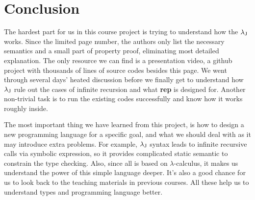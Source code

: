 \section{Conclusion}
\label{conclusion}

The hardest part for us in this course project is trying to understand how the ${\lambda_{\text{J}}}$ works. Since the limited page number, the authors only list the necessary semantics and a small part of property proof, eliminating most detailed explanation. The only resource we can find is a presentation video, a github project with thousands of lines of source codes besides this page. We went through several days' heated discussion before we finally get to understand how ${\lambda_{\text{J}}}$ rule out the cases of infinite recursion and what \textbf{rep} is designed for. Another non-trivial task is to run the existing codes successfully and know how it works roughly inside.

The most important thing we have learned from this project, is how to design a new programming language for a specific goal, and what we should deal with as it may introduce extra problems. For example, ${\lambda_{\text{J}}}$ syntax leads to infinite recursive calls via symbolic expression, so it provides complicated static semantic to constrain the type checking. Also, since all is based on {\ensuremath{\lambda}}-calculus, it makes us understand the power of this simple language deeper. It's also a good chance for us to look back to the teaching materials in previous courses. All these help us to understand types and programming language better.